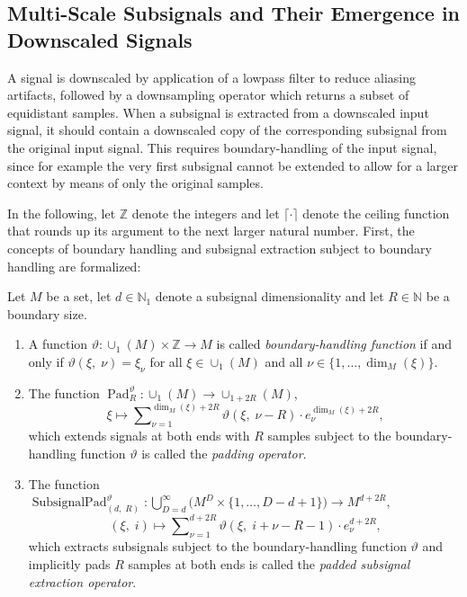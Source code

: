 \documentclass[journal]{IEEEtran}
\newcommand{\N}{\mathbb{N}}
\newcommand{\Z}{\mathbb{Z}}
\newcommand{\discint}[2]{\{#1,\dotsc,#2\}}
\newcommand{\inint}[2]{\in\discint{#1}{#2}}
\newcommand{\nceil}[1]{\lceil #1 \rceil}
\DeclareMathOperator{\Padding}{Pad}
\newcommand{\PaddingParams}{\Padding_R^\vartheta}
\DeclareMathOperator{\SubsignalPad}{SubsignalPad}
\newcommand{\SubsignalPadParams}{\SubsignalPad_{(d,\; R)}^{\vartheta}}
\begin{document}
\subsection{Multi-Scale Subsignals and Their Emergence in Downscaled Signals}\label{sect:multi_scale_fund}
A signal is downscaled by application of a lowpass filter to reduce aliasing artifacts, followed by a downsampling operator which returns a subset of equidistant samples.
When a subsignal is extracted from a downscaled input signal, it should contain a downscaled copy of the corresponding subsignal from the original input signal.
This requires boundary-handling of the input signal, since for example the very first subsignal cannot be extended to allow for a larger context by means of only the original samples.

In the following, let $\Z$ denote the integers and let $\nceil{\cdot}$ denote the ceiling function that rounds up its argument to the next larger natural number.
First, the concepts of boundary handling and subsignal extraction subject to boundary handling are formalized:

\begin{definition}
\label{def:subsignalpad}
\label{def:padding}
Let $M$ be a set, let $d\in\N_1$ denote a subsignal dimensionality and let $R\in\N$ be a boundary size.
\begin{enumerate}
  \item A function $\vartheta\colon\cup_1(M)\times\Z\to M$ is called \emph{boundary-handling function} if and only if $\vartheta(\xi,\;\nu) = \xi_\nu$ for all $\xi\in\cup_1(M)$ and all $\nu\inint{1}{\dim_M(\xi)}$.
  \item The function $\PaddingParams\colon\cup_1(M)\to \cup_{1 + 2R}(M)$,
    \begin{displaymath}
      \xi\mapsto\sum\nolimits_{\nu = 1}^{\dim_M(\xi) + 2R} \vartheta(\xi,\;\nu - R)\cdot e_\nu^{\dim_M(\xi) + 2R}\text{,}
    \end{displaymath}
    which extends signals at both ends with $R$ samples subject to the boundary-handling function $\vartheta$ is called the \emph{padding operator}.
  \item The function $\SubsignalPadParams\colon\bigcup\nolimits_{D = d}^\infty\big(M^D\times\discint{1}{D - d + 1}\big)\to M^{d + 2R}$,
    \begin{displaymath}
      (\xi,\; i)\mapsto\sum\nolimits_{\nu = 1}^{d + 2R}\vartheta(\xi,\;i + \nu - R - 1)\cdot e_\nu^{d + 2R}\text{,}
    \end{displaymath}
    which extracts subsignals subject to the boundary-handling function $\vartheta$ and implicitly pads $R$ samples at both ends is called the \emph{padded subsignal extraction operator}.
\end{enumerate}
\end{definition}
\end{document}
